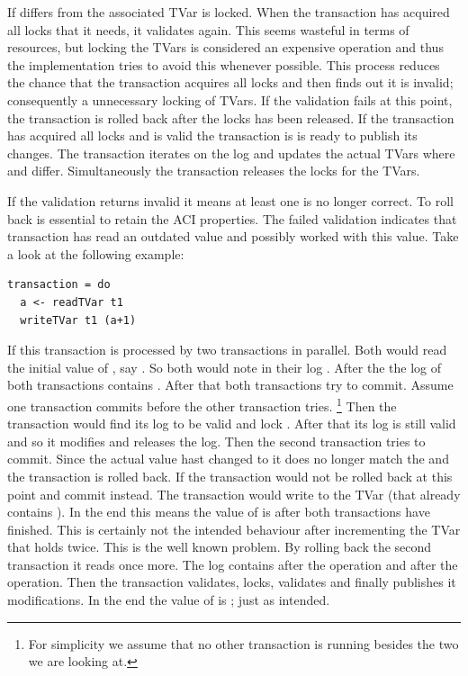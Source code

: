 If  differs from  the associated TVar is locked. When the transaction has acquired all 
locks that it needs, it validates again. This seems wasteful in terms of resources, but locking the TVars is considered
an expensive operation and thus the implementation tries to avoid this whenever possible. This process reduces the chance
that the transaction acquires all locks and then finds out it is invalid; consequently a unnecessary locking of TVars.
If the validation fails at this point, the transaction is rolled back after the locks has been released.
If the transaction has acquired all locks and is valid the transaction is is ready to publish its changes.
The transaction iterates on the log and updates the actual TVars where  and  differ. 
Simultaneously the transaction releases the locks for the TVars. 

If the validation returns invalid it means at least one  is no longer correct. To roll back is essential 
to retain the ACI properties. The failed validation indicates that transaction has read an outdated value and possibly worked 
with this value. Take a look at the following example:
\begin{lstlisting}
transaction = do 
  a <- readTVar t1
  writeTVar t1 (a+1)
\end{lstlisting}
If this transaction is processed by two transactions in parallel. Both would read the initial value of , say .
So both would note in their log . After the  the log of both transactions contains 
. After that both transactions try to commit. Assume one transaction commits before the other transaction tries.
\footnote{For simplicity we assume that no other transaction is running besides the two we are looking at.}
Then the transaction would find its log to be valid and lock . After that its log is still valid and so it modifies 
 and releases the log. 
Then the second transaction tries to commit. Since the actual value hast changed to  it does no longer match 
the  and the transaction is rolled back. If the transaction would not be rolled back at this point
and commit instead. The transaction would write  to the TVar (that already contains ). In the end 
this means the value of  is  after both transactions have finished. This is certainly not the 
intended behaviour after incrementing the TVar that holds  twice. This is the well known 
problem. 
By rolling back the second transaction it reads  once more. The log contains  after the 
operation and  after the  operation. Then the transaction validates, locks, validates and 
finally publishes it modifications. In the end the value of  is ; just as intended.

